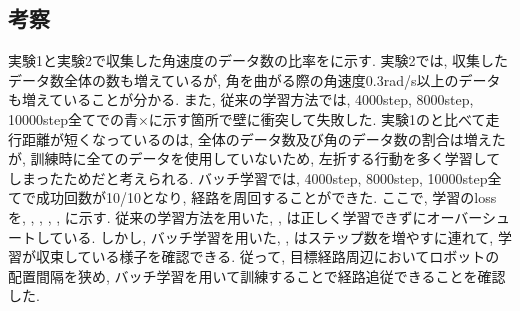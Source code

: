 \subsection{考察}
実験1と実験2で収集した角速度のデータ数の比率をに示す. 実験2では, 収集したデータ数全体の数も増えているが, 角を曲がる際の角速度0.3rad/s以上のデータも増えていることが分かる. また, 従来の学習方法では, 4000step, 8000step, 10000step全てでの青×に示す箇所で壁に衝突して失敗した. 実験1のと比べて走行距離が短くなっているのは, 全体のデータ数及び角のデータ数の割合は増えたが, 訓練時に全てのデータを使用していないため, 左折する行動を多く学習してしまったためだと考えられる. バッチ学習では, 4000step, 8000step, 10000step全てで成功回数が10/10となり, 経路を周回することができた. ここで, 学習のlossを, , , , , に示す. 従来の学習方法を用いた, , は正しく学習できずにオーバーシュートしている. しかし, バッチ学習を用いた, , はステップ数を増やすに連れて, 学習が収束している様子を確認できる. 従って, 目標経路周辺においてロボットの配置間隔を狭め, バッチ学習を用いて訓練することで経路追従できることを確認した. 

